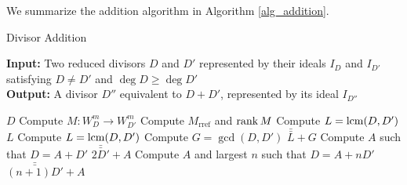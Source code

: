 
We summarize the addition algorithm in Algorithm \ref{alg_addition}.

\begin{algorithm}
  \label{alg_addition}
  \caption{Divisor Addition}
  {\bf Input:} Two reduced divisors $D$ and $D'$ represented by their ideals $I_D$ and $I_{D'}$
  satisfying $D \neq D'$ and $\deg D \geq \deg D'$ \\
  {\bf Output:} A divisor $D''$ equivalent to $D + D'$, represented by its ideal $I_{D''}$
  \begin{algorithmic}[1]
      \State \Return $D$ \label{alg_addition:return_0}
    \EndIf
    \State Compute $M : W_D^m \to W_{D'}^m$
    \State Compute $M_{\text{rref}}$ and $\operatorname{rank} M$
      \State Compute $L = \operatorname{lcm}(D, D')$
      \State \Return $L$ \label{alg_addition:return_1}
    \EndIf
      \State Compute $L = \operatorname{lcm}(D, D')$
      \State Compute $G = \gcd(D, D')$
      \State \Return $\bar{\bar L} + G$ \label{alg_addition:return_2}
    \EndIf
        \State Compute $A$ such that $D = A + D'$
        \State \Return $\bar{\bar{2D'}} + A$ \label{alg_addition:return_3}
      \EndIf
        \State Compute $A$ and largest $n$ such that $D = A + nD'$
        \State \Return $\bar{\bar{(n+1)D'}} + A$ \label{alg_addition:return_4}
      \EndIf
    \EndIf
  \end{algorithmic}
\end{algorithm}

